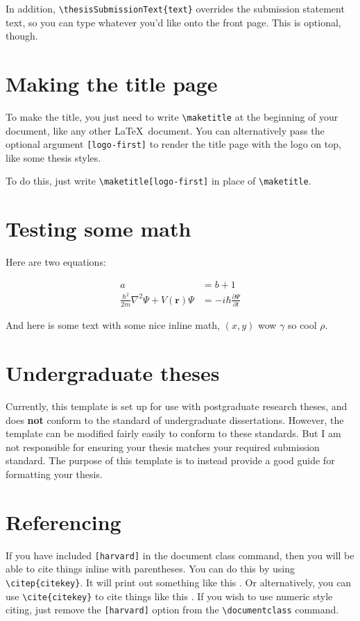 In addition, \texttt{\textbackslash thesisSubmissionText\{text\}} overrides the submission statement text, so you can type whatever you'd like onto the front page. This is optional, though.

\section{Making the title page}
To make the title, you just need to write \texttt{\textbackslash maketitle} at the beginning of your document, like any other \LaTeX~document. You can alternatively pass the optional argument \texttt{[logo-first]} to render the title page with the logo on top, like some thesis styles.

To do this, just write \texttt{\textbackslash maketitle[logo-first]} in place of \texttt{\textbackslash maketitle}.

\section{Testing some math}
Here are two equations:

\begin{align}
    a & = b + 1                                   \\
    \frac{\hbar^2}{2m}\nabla^2\Psi + V(\mathbf{r})\Psi
      & = -i\hbar \frac{\partial\Psi}{\partial t}
\end{align}


And here is some text with some nice inline math, $(x, y)$ wow $\gamma$ so cool $\rho$.


\section{Undergraduate theses}
Currently, this template is set up for use with postgraduate research theses, and does \textbf{not} conform to the standard of undergraduate dissertations. However, the template can be modified fairly easily to conform to these standards. But I am not responsible for ensuring your thesis matches your required submission standard. The purpose of this template is to instead provide a good guide for formatting your thesis.

\section{Referencing}
If you have included \texttt{[harvard]} in the document class command, then you will be able to cite things inline with parentheses. You can do this by using \texttt{\textbackslash citep\{citekey\}}. It will print out something like this \citep{aad2012observation}. Or alternatively, you can use \texttt{\textbackslash cite\{citekey\}} to cite things like this \cite{chatrchyan2012observation}. If you wish to use numeric style citing, just remove the \texttt{[harvard]} option from the \texttt{\textbackslash documentclass} command.

